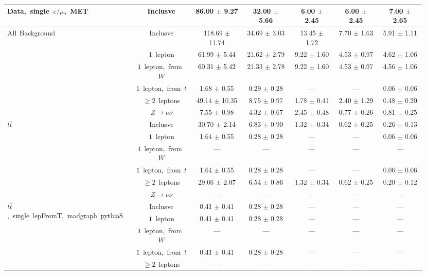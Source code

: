\documentclass{article}
\begin{document}
\begin{longtable}{|l|c|c|c|c|c|c|}
\multirow{1}{*}{Data,~single~$e/\mu$,~MET} & Inclusve  & 86.00 $\pm$ 9.27  & 32.00 $\pm$ 5.66  & 6.00 $\pm$ 2.45  & 6.00 $\pm$ 2.45  & 7.00 $\pm$ 2.65 \\* 
\hline \hline 
\multirow{6}{*}{All~Background} & Inclusve  & 118.69 $\pm$ 11.74  & 34.69 $\pm$ 3.03  & 13.45 $\pm$ 1.72  & 7.70 $\pm$ 1.63  & 5.91 $\pm$ 1.11 \\* 
 & $1$~lepton  & 61.99 $\pm$ 5.44  & 21.62 $\pm$ 2.79  & 9.22 $\pm$ 1.60  & 4.53 $\pm$ 0.97  & 4.62 $\pm$ 1.06 \\* 
 & $1$~lepton,~from~$W$  & 60.31 $\pm$ 5.42  & 21.33 $\pm$ 2.78  & 9.22 $\pm$ 1.60  & 4.53 $\pm$ 0.97  & 4.56 $\pm$ 1.06 \\* 
 & $1$~lepton,~from~$t$  & 1.68 $\pm$ 0.55  & 0.29 $\pm$ 0.28  & ---  & ---  & 0.06 $\pm$ 0.06 \\* 
 & $\ge2$~leptons  & 49.14 $\pm$ 10.35  & 8.75 $\pm$ 0.97  & 1.78 $\pm$ 0.41  & 2.40 $\pm$ 1.29  & 0.48 $\pm$ 0.20 \\* 
 & $Z\rightarrow\nu\nu$  & 7.55 $\pm$ 0.98  & 4.32 $\pm$ 0.67  & 2.45 $\pm$ 0.48  & 0.77 $\pm$ 0.26  & 0.81 $\pm$ 0.25 \\* 
\hline 
\multirow{6}{*}{$t\bar{t}$} & Inclusve  & 30.70 $\pm$ 2.14  & 6.83 $\pm$ 0.90  & 1.32 $\pm$ 0.34  & 0.62 $\pm$ 0.25  & 0.26 $\pm$ 0.13 \\* 
 & $1$~lepton  & 1.64 $\pm$ 0.55  & 0.28 $\pm$ 0.28  & ---  & ---  & 0.06 $\pm$ 0.06 \\* 
 & $1$~lepton,~from~$W$  & ---  & ---  & ---  & ---  & --- \\* 
 & $1$~lepton,~from~$t$  & 1.64 $\pm$ 0.55  & 0.28 $\pm$ 0.28  & ---  & ---  & 0.06 $\pm$ 0.06 \\* 
 & $\ge2$~leptons  & 29.06 $\pm$ 2.07  & 6.54 $\pm$ 0.86  & 1.32 $\pm$ 0.34  & 0.62 $\pm$ 0.25  & 0.20 $\pm$ 0.12 \\* 
 & $Z\rightarrow\nu\nu$  & ---  & ---  & ---  & ---  & --- \\* 
\hline 
\multirow{6}{*}{$t\bar{t}$,~single~lepFromT,~madgraph~pythia8} & Inclusve  & 0.41 $\pm$ 0.41  & 0.28 $\pm$ 0.28  & ---  & ---  & --- \\* 
 & $1$~lepton  & 0.41 $\pm$ 0.41  & 0.28 $\pm$ 0.28  & ---  & ---  & --- \\* 
 & $1$~lepton,~from~$W$  & ---  & ---  & ---  & ---  & --- \\* 
 & $1$~lepton,~from~$t$  & 0.41 $\pm$ 0.41  & 0.28 $\pm$ 0.28  & ---  & ---  & --- \\* 
 & $\ge2$~leptons  & ---  & ---  & ---  & ---  & --- \\* 

\end{longtable}
\end{document}
